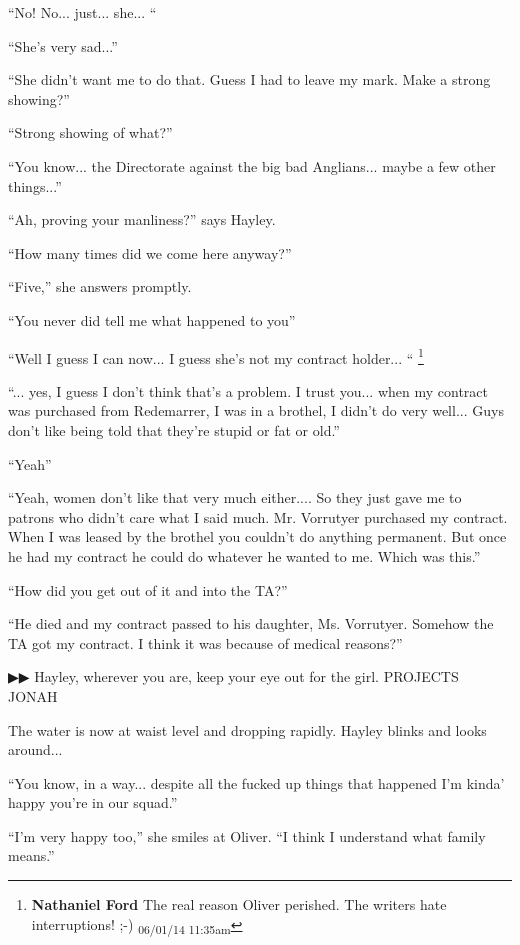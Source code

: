 ``No! No... just... she... ``

``She's very sad...''

``She didn't want me to do that.  Guess I had to leave my mark.  Make a strong showing?''

``Strong showing of what?''

``You know... the Directorate against the big bad Anglians... maybe a few other things...''

``Ah, proving your manliness?'' says Hayley.

``How many times did we come here anyway?''

``Five,'' she answers promptly.

``You never did tell me what happened to you''

``Well I guess I can now... I guess she's not my contract holder... ``
\footnote{\textbf{Nathaniel Ford }The real reason Oliver perished. The writers hate interruptions! ;-) \textsubscript{06/01/14 11:35am}}

``... yes, I guess I don't think that's a problem.  I trust you... when my contract was purchased from Redemarrer, I was in a brothel, I didn't do very well... Guys don't like being told that they're stupid or fat or old.''

``Yeah''

``Yeah, women don't like that very much either.... So they just gave me to patrons who didn't care what I said much.  Mr. Vorrutyer purchased my contract.  When I was leased by the brothel you couldn't do anything permanent.  But once he had my contract he could do whatever he wanted to me.  Which was this.''

``How did you get out of it and into the TA?''

``He died and my contract passed to his daughter, Ms. Vorrutyer.  Somehow the TA got my contract.  I think it was because of medical reasons?''



 {\color[RGB]{68,68,68}▶▶}  Hayley, wherever you are, keep your eye out for the girl.  PROJECTS JONAH



The water is now at waist level and dropping rapidly.  Hayley blinks and looks around... 

``You know, in a way... despite all the fucked up things that happened I'm kinda' happy you're in our squad.''

``I'm very happy too,'' she smiles at Oliver.  ``I think I understand what family means.''

